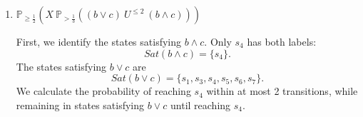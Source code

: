 \documentclass[12pt,a4paper]{article}
\begin{document}
\begin{description}
\begin{enumerate}[label=\alph*)]
For the remaining states, we calculate the probabilities
of reaching $c$ while staying in $b$.

Let $x_i$ denote the probability of satisfying $b\ U\ c$
starting from state $s_i$.

From the transitions in the diagram, we obtain:

\[
x_1 = \frac{1}{4}+\frac{1}{4}+\frac{1}{4}x_6
\]
\[
x_5 = \frac{1}{3}+\frac{1}{3}x_1+\frac{1}{3}x_6
\]
\[
x_6 = \frac{1}{2}+\frac{1}{2}x_5.
\]

Simplifying the first equation:
\[
x_1=\frac{1}{2}+\frac{1}{4}x_6.
\]

Substituting this into the other equations:
\[
x_5=\frac{1}{3}
+\frac{1}{3}\left(\frac{1}{2}+\frac{1}{4}x_6\right)
+\frac{1}{3}x_6.
\]

Therefore,
\[
x_5=\frac{1}{2}+\frac{5}{12}x_6.
\]

Using $x_6=\frac{1}{2}+\frac{1}{2}x_5$,
we get
\[
x_5=\frac{1}{2}
+\frac{5}{12}\left(\frac{1}{2}+\frac{1}{2}x_5\right).
\]

Solving:
\[
x_5=\frac{17}{19}.
\]

Consequently,
\[
x_6=\frac{1}{2}+\frac{1}{2}\cdot\frac{17}{19}
=\frac{18}{19},
\]
and
\[
x_1=\frac{1}{2}+\frac{1}{4}\cdot\frac{18}{19}
=\frac{14}{19}.
\]

We now compare the probabilities with the required threshold
$\frac{17}{19}$:

\[
\begin{array}{c|c|c}
\text{State} & \text{Probability} & \text{Satisfies?}\\
\hline
s_0 & 0 & \text{No}\\
s_1 & \frac{14}{19} & \text{No}\\
s_2 & 0 & \text{No}\\
s_3 & 1 & \text{Yes}\\
s_4 & 1 & \text{Yes}\\
s_5 & \frac{17}{19} & \text{Yes}\\
s_6 & \frac{18}{19} & \text{Yes}\\
s_7 & 1 & \text{Yes}
\end{array}
\]

Therefore, the set of satisfying states is
\[
\boxed{
Sat\left(\mathbb{P}_{\geq \frac{17}{19}}(b\ U\ c)\right)
=
\{s_3,s_4,s_5,s_6,s_7\}.
}
\]

\color{black}
\fi
%
\item $\mathbb{P}_{\ge \frac{1}{2}}(X\ \mathbb{P}_{> \frac{1}{3}}((b \lor c)\ U^{\le 2}\ (b \land c)))$
%
\ifwithanswers
\color{blue}
\par
First, we identify the states satisfying $b\land c$.
Only $s_4$ has both labels:
\[
Sat(b\land c)=\{s_4\}.
\]
The states satisfying $b\lor c$ are
\[
Sat(b\lor c)=\{s_1,s_3,s_4,s_5,s_6,s_7\}.
\]
We calculate the probability of reaching $s_4$
within at most 2 transitions, while remaining in states
satisfying $b\lor c$ until reaching $s_4$.


\end{enumerate}
\end{description}
\end{document}
